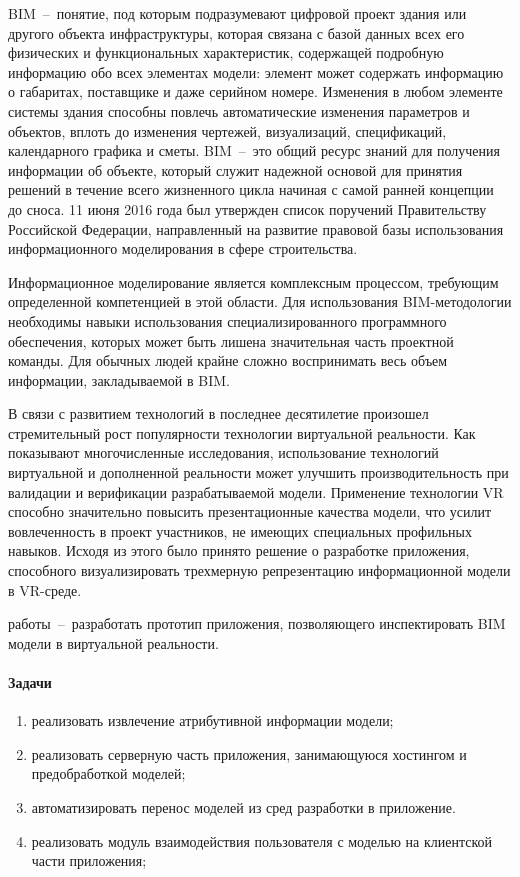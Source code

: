 ﻿
BIM~--~понятие, под которым подразумевают цифровой проект здания или другого объекта инфраструктуры,
которая связана с базой данных всех его физических и функциональных характеристик,
содержащей подробную информацию обо всех элементах модели:
элемент может содержать информацию о габаритах, поставщике и даже серийном номере. 
Изменения в любом элементе системы здания способны повлечь автоматические изменения  параметров и объектов, 
вплоть до изменения чертежей, визуализаций, спецификаций, календарного графика и сметы.
BIM~--~это общий ресурс знаний для получения информации об объекте,
который служит надежной основой для принятия решений в течение всего жизненного цикла
начиная с самой ранней концепции до сноса.%
\cite{NationalBIMfaqs}
11 июня 2016 года был утвержден список поручений Правительству Российской Федерации,
направленный на развитие правовой базы использования информационного моделирования в сфере строительства.%
\cite{KremlinInstraction2016}

Информационное моделирование является комплексным процессом,
требующим определенной компетенцией в этой области.
Для использования BIM-методологии необходимы навыки использования специализированного программного обеспечения,
которых может быть лишена значительная часть проектной команды.
Для обычных людей крайне сложно воспринимать весь объем информации, закладываемой в BIM.

В связи с развитием технологий в последнее десятилетие
произошел стремительный рост популярности технологии виртуальной реальности.%
\cite{Cipresso2018}
Как показывают многочисленные исследования,
использование технологий виртуальной и дополненной реальности может улучшить
производительность при валидации и верификации разрабатываемой модели.
Применение технологии VR способно значительно повысить презентационные качества модели,
что усилит вовлеченность в проект участников,
не имеющих специальных профильных навыков.%
\cite{Akpan2018}
Исходя из этого было принято решение о разработке приложения,
способного визуализировать трехмерную репрезентацию информационной модели в VR-среде. 

{ работы}~--~разработать прототип приложения, позволяющего инспектировать BIM модели в виртуальной реальности.

\paragraph{Задачи}
\begin{enumerate}
    \item реализовать извлечение атрибутивной информации модели;
    \item реализовать серверную часть приложения, занимающуюся хостингом и предобработкой моделей;
    \item автоматизировать перенос моделей из сред разработки в приложение.
    \item реализовать модуль взаимодействия пользователя с моделью на клиентской части приложения;
\end{enumerate}

